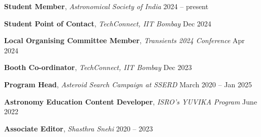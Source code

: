 \textbf{Student Member}, \textit{Astronomical Society of India} \hfill 2024 -- present

\vspace{0.2em}

\textbf{Student Point of Contact}, \textit{TechConnect, IIT Bombay} \hfill Dec 2024 \\

\vspace{0.2em}

\textbf{Local Organising Committee Member}, \textit{Transients 2024 Conference} \hfill Apr 2024 \\

\vspace{0.2em}

\textbf{Booth Co-ordinator}, \textit{TechConnect, IIT Bombay }\hfill Dec 2023 \\

\vspace{0.2em}

\textbf{Program Head}, \textit{Asteroid Search Campaign at SSERD} \hfill March 2020 -- Jan 2025 \\

\vspace{0.2em}

\textbf{Astronomy Education Content Developer}, \textit{ISRO's YUVIKA Program} \hfill June 2022 \\

\vspace{0.2em}

\textbf{Associate Editor}, \textit{Shasthra Snehi} \hfill 2020 -- 2023 \\